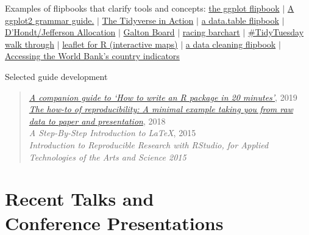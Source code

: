 \documentclass[margin, 10pt]{CVStyleTemplate}\usepackage[]{graphicx}\usepackage[dvipsnames]{xcolor}
\begin{document}
\begin{resume}
Examples of flipbooks that clarify tools and concepts: \href{https://github.com/EvaMaeRey/ggplot_flipbook}{the ggplot flipbook}
$|$ \href{https://evamaerey.github.io/ggplot2_grammar_guide/ggplot2_grammar_guide}{A ggplot2 grammar guide.}
$|$ \href{https://github.com/EvaMaeRey/tidyverse_in_action}{The Tidyverse in Action}
$|$  \href{https://evamaerey.github.io/little_flipbooks_library/data.table/data.table}{a data.table flipbook}
$|$ \href{https://evamaerey.github.io/little_flipbooks_library/dhondt_jefferson_allocation/dhondt_jefferson_allocation}{D’Hondt/Jefferson Allocation}
$|$ \href{https://evamaerey.github.io/little_flipbooks_library/galton_board/galton_board.html#1}{Galton Board}
$|$ \href{https://evamaerey.github.io/little_flipbooks_library/racing_bars/racing_barcharts.html}{racing barchart}
$|$  \href{https://evamaerey.github.io/tidytuesday_walk_through/tidytuesday_highlights.html}{\#TidyTuesday walk through}
$|$  \href{https://evamaerey.github.io/little_flipbooks_library/leaflet/leaflet#1}{leaflet for R (interactive maps)}
$|$ \href{https://evamaerey.github.io/little_flipbooks_library/data_cleaning/data_cleaning#1}{a data cleaning flipbook}
$|$  \href{https://evamaerey.github.io/little_flipbooks_library/wbstats/wbstats#1}{Accessing the World Bank's country indicators}



Selected guide development

\begin{quotation}\noindent
\emph{\href{https://evamaerey.github.io/package_in_20_minutes/package_in_20_minutes}{A companion guide to `How to write an R package in 20 minutes'}}, 2019 \\[6pt]
\emph{\href{https://github.com/EvaMaeRey/from_raw_data_to_paper_and_presentation}{The how-to of reproducibility: A minimal example taking you from raw data to paper and presentation}}, 2018 \\[6pt]
\emph{A Step-By-Step Introduction to \LaTeX}, 2015\\[6pt]%
\emph{Introduction to Reproducible Research with RStudio, for Applied Technologies of the Arts and Science 2015}%
\end{quotation}
%

%
%
%


\section{Recent Talks and \\ Conference Presentations}




\end{resume}
\end{document}
